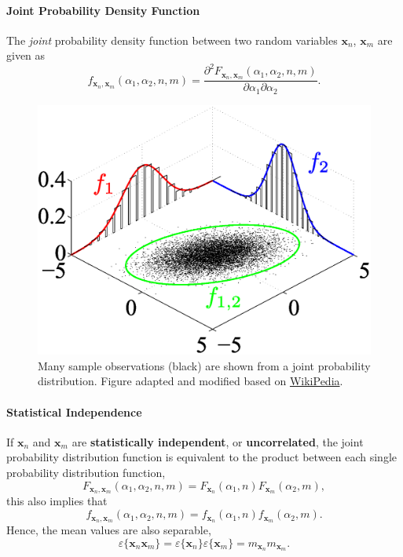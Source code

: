 \paragraph{Joint Probability Density Function} The \textit{joint} probability density function between two random variables $\mathbf{x}_n$,  $\mathbf{x}_m$ are given as
\[
    f_{\mathbf{x}_n, \mathbf{x}_m}(\alpha_1, \alpha_2, n,m) = \frac{\partial^2  F_{\mathbf{x}_n, \mathbf{x}_m}(\alpha_1, \alpha_2, n,m)}{\partial \alpha_1 \partial \alpha_2}.
\]
\begin{figure}[H]
    \centering
    \includegraphics[scale=.5]{images/Multivariate_normal_sample.eps}
    \caption{Many sample observations (black) are shown from a joint probability distribution. Figure adapted and modified based on \href{https://en.wikipedia.org/wiki/Joint_probability_distribution\#/media/File:Multivariate_normal_sample.svg}{WikiPedia}.}
    \label{fig:joint_pdf}
\end{figure}

\paragraph{Statistical Independence} If $\mathbf{x}_n$ and $\mathbf{x}_m$ are \textbf{statistically independent}, or \textbf{uncorrelated}, the joint probability distribution function is equivalent to the product between each single probability distribution function,
\[
    F_{\mathbf{x}_n, \mathbf{x}_m}(\alpha_1, \alpha_2, n,m) = F_{\mathbf{x}_n}(\alpha_1, n)F_{\mathbf{x}_m}(\alpha_2, m),
\]
this also implies that
\[
    f_{\mathbf{x}_n, \mathbf{x}_m}(\alpha_1, \alpha_2, n,m) = f_{\mathbf{x}_n}(\alpha_1, n)f_{\mathbf{x}_m}(\alpha_2, m).
\]
Hence, the mean values are also separable,
\[
    \varepsilon\{\mathbf{x}_n \mathbf{x}_m\} = \varepsilon\{\mathbf{x}_n\}\varepsilon\{\mathbf{x}_m\} = m_{\mathbf{x}_n}m_{\mathbf{x}_m}.
\]

